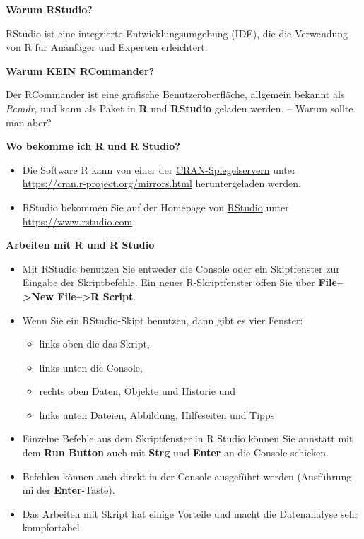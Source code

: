\documentclass[10pt,ngerman,onside]{article}
\providecommand{\tightlist}{%
  \setlength{\itemsep}{0pt}\setlength{\parskip}{0pt}}
\begin{document}
\textbf{Warum RStudio?}

RStudio ist eine integrierte Entwicklungsumgebung (IDE), die die
Verwendung von R für Anänfäger und Experten erleichtert.

\textbf{Warum KEIN RCommander?}

Der RCommander ist eine grafische Benutzeroberfläche, allgemein bekannt
als \emph{Rcmdr}, und kann als Paket in \textbf{R} und \textbf{RStudio}
geladen werden. -- Warum sollte man aber?

\textbf{Wo bekomme ich \textbf{R} und \textbf{R Studio}?}

\begin{itemize}
\tightlist
\item
  Die Software R kann von einer der
  \href{https://cran.r-project.org/mirrors.html}{CRAN-Spiegelservern}
  unter \url{https://cran.r-project.org/mirrors.html} heruntergeladen
  werden.
\item
  RStudio bekommen Sie auf der Homepage von
  \href{https://www.rstudio.com}{RStudio} unter
  \url{https://www.rstudio.com}.
\end{itemize}

\textbf{Arbeiten mit \textbf{R} und \textbf{R Studio}}

\begin{itemize}
\item
  Mit RStudio benutzen Sie entweder die Console oder ein Skiptfenster
  zur Eingabe der Skriptbefehle. Ein neues R-Skriptfenster öffen Sie
  über \textbf{File--\textgreater{}New File--\textgreater{}R Script}.
\item
  Wenn Sie ein RStudio-Skipt benutzen, dann gibt es vier Fenster:

  \begin{itemize}
  \tightlist
  \item
    links oben die das Skript,
  \item
    links unten die Console,
  \item
    rechts oben Daten, Objekte und Historie und
  \item
    links unten Dateien, Abbildung, Hilfeseiten und Tipps
  \end{itemize}
\item
  Einzelne Befehle aus dem Skriptfenster in R Studio können Sie annstatt
  mit dem \textbf{Run Button} auch mit \textbf{Strg} und \textbf{Enter}
  an die Console schicken.
\item
  Befehlen können auch direkt in der Console ausgeführt werden
  (Ausführung mi der \textbf{Enter}-Taste).
\item
  Das Arbeiten mit Skript hat einige Vorteile und macht die Datenanalyse
  sehr kompfortabel.
\end{itemize}
\end{document}
